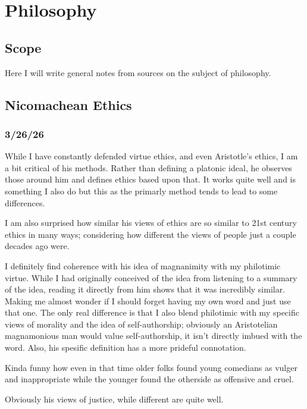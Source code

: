 \chapter{Philosophy}
\section{Scope}
Here I will write general notes from sources on the subject of philosophy.
\section{Nicomachean Ethics}
\subsection{3/26/26}
While I have constantly defended virtue ethics, and even Aristotle's ethics, I am a bit critical of his methods. Rather than defining a platonic ideal, he observes those around him and defines ethics based upon that. It works quite well and is something I also do but this as the primarly method tends to lead to some differences.

I am also surprised how similar his views of ethics are so similar to 21st century ethics in many ways; considering how different the views of people just a couple decades ago were.

I definitely find coherence with his idea of magnanimity with my philotimic virtue. While I had originally conceived of the idea from listening to a summary of the idea, reading it directly from him shows that it was incredibly similar. Making me almost wonder if I should forget having my own word and just use that one. The only real difference is that I also blend philotimic with my specific views of morality and the idea of self-authorship; obviously an Aristotelian magnamonious man would value self-authorship, it isn't directly imbued with the word. Also, his spesific definition has a more prideful connotation.

Kinda funny how even in that time older folks found young comedians as vulger and inappropriate while the younger found the otherside as offensive and cruel.

Obviously his views of justice, while different are quite well.
